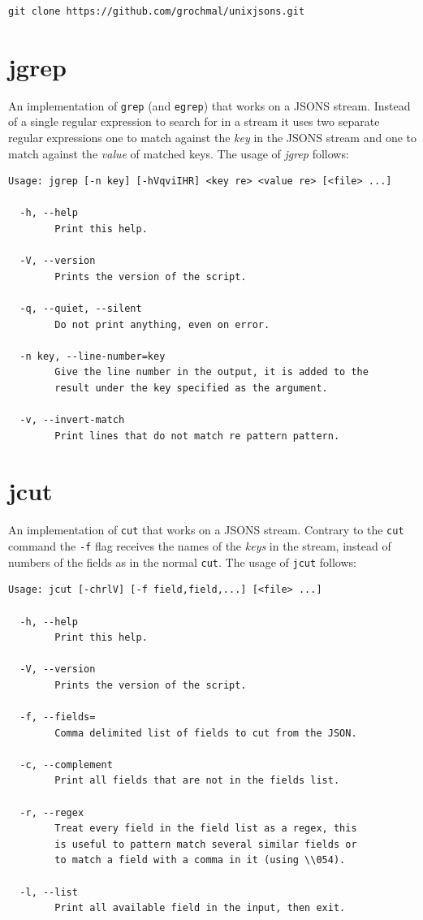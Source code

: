 \documentclass[11pt,a4paper,twoside,openright,draft]{report}
\begin{document}
\begin{verbatim}
git clone https://github.com/grochmal/unixjsons.git
\end{verbatim}


\section{jgrep}

An implementation of \texttt{grep} (and \texttt{egrep}) that works on a JSONS
stream.  Instead of a single regular expression to search for in a stream it
uses two separate regular expressions one to match against the \emph{key} in
the JSONS stream and one to match against the \emph{value} of matched keys.
The usage of \emph{jgrep} follows:

{\small
\begin{Verbatim}[samepage=true]
Usage: jgrep [-n key] [-hVqviIHR] <key re> <value re> [<file> ...]

  -h, --help
        Print this help.

  -V, --version
        Prints the version of the script.

  -q, --quiet, --silent
        Do not print anything, even on error.

  -n key, --line-number=key
        Give the line number in the output, it is added to the
        result under the key specified as the argument.

  -v, --invert-match
        Print lines that do not match re pattern pattern.
\end{Verbatim}
}

\section{jcut}

An implementation of \texttt{cut} that works on a JSONS stream.  Contrary to
the \texttt{cut} command the \texttt{-f} flag receives the names of the
\emph{keys} in the stream, instead of numbers of the fields as in the normal
\texttt{cut}.  The usage of \texttt{jcut} follows:

{\small
\begin{Verbatim}[samepage=true]
Usage: jcut [-chrlV] [-f field,field,...] [<file> ...]

  -h, --help
        Print this help.

  -V, --version
        Prints the version of the script.

  -f, --fields=
        Comma delimited list of fields to cut from the JSON.

  -c, --complement
        Print all fields that are not in the fields list.

  -r, --regex
        Treat every field in the field list as a regex, this
        is useful to pattern match several similar fields or
        to match a field with a comma in it (using \\054).

  -l, --list
        Print all available field in the input, then exit.
\end{Verbatim}
}
\end{document}
